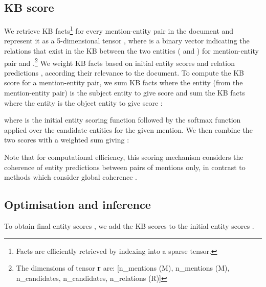\documentclass[11pt]{article}
\begin{document}
\subsection{KB score }


























We retrieve KB facts\footnote{Facts are efficiently retrieved by indexing into a sparse tensor.} for every mention-entity pair in the document and represent it as a 5-dimensional tensor , where  is a binary vector indicating the relations that exist in the KB between the two entities ( and ) for mention-entity pair  and .\footnote{{The dimensions of tensor \textbf{r} are: [n\_mentions (M), n\_mentions (M), n\_candidates, n\_candidates, n\_relations (R)]}}
We weight KB facts  based on initial entity scores  and relation predictions , according their relevance to the document. To compute the KB score  for a mention-entity pair, we sum KB facts where the entity (from the mention-entity pair) is the subject entity to give score  and sum the KB facts where the entity is the object entity to give score :

\small{

}

\small{

}

\normalsize
where  is the initial entity scoring function  followed by the softmax function applied over the candidate entities for the given mention. We then combine the two scores with a weighted sum giving :




Note that for computational efficiency, this scoring mechanism considers the coherence of entity predictions between pairs of mentions only, in contrast to methods which consider global coherence \citet{hoffart-etal-2011-robust}. 


\subsection{Optimisation and inference}
To obtain final entity scores , we add the KB scores  to the initial entity scores .
\end{document}
